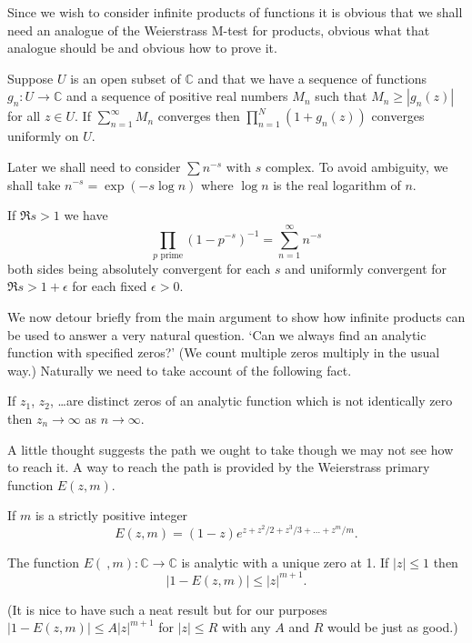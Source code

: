 Since we wish to consider infinite products of functions
it is obvious that we shall need an analogue
of the Weierstrass M-test for products, obvious what that
analogue should be and obvious how to prove it.
\begin{lemma} Suppose $U$ is an open subset of ${\mathbb C}$
and that we have a sequence of functions 
$g_{n}:U\rightarrow{\mathbb C}$ and a sequence of positive
real numbers $M_{n}$ such that $M_{n}\geq |g_{n}(z)|$
for all $z\in U$. If $\sum_{n=1}^{\infty}M_{n}$
converges then $\prod_{n=1}^{N}(1+g_{n}(z))$ converges
uniformly on $U$.
\end{lemma}
Later we shall need to consider $\sum n^{-s}$ with $s$ complex.
To avoid ambiguity, we shall take $n^{-s}=\exp(-s\log n)$
where $\log n$ is the real logarithm of $n$.
\begin{lemma} If $\Re s>1$ we have
\[\prod_{\text{$p$ prime}}(1-p^{-s})^{-1}=\sum_{n=1}^{\infty}n^{-s}\]
both sides being absolutely convergent for each $s$
and uniformly convergent for $\Re s>1+\epsilon$ for
each fixed $\epsilon>0$.
\end{lemma}

We now detour briefly from the main argument to show
how infinite products can be used to answer a
very natural question. `Can we always find an analytic
function
with specified zeros?' (We count multiple zeros
multiply in the usual way.) Naturally we need to
take account of the following fact.
\begin{lemma} If $z_{1}$, $z_{2}$, \dots are distinct zeros
of an analytic function which is not identically
zero then $z_{n}\rightarrow\infty$ as $n\rightarrow\infty$.
\end{lemma}

A little thought suggests the path we ought to take
though we may not see how to reach it. A way to
reach the path is provided by the Weierstrass
primary function $E(z,m)$.
\begin{definition} If $m$ is a strictly positive integer
\[E(z,m)=(1-z)e^{z+z^{2}/2+z^{3}/3+\dots+z^{m}/m}.\]
\end{definition}
\begin{lemma} The function $E(\ ,m):\mathbb{C}\rightarrow\mathbb{C}$
is analytic with a unique zero at 1. If $|z|\leq 1$
then
\[|1-E(z,m)|\leq |z|^{m+1}.\]
\end{lemma}
(It is nice to have such a neat result but for our purposes
$|1-E(z,m)|\leq A|z|^{m+1}$ for $|z|\leq R$ with any $A$
and $R$ would be just as good.)

